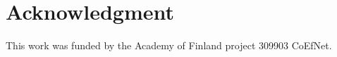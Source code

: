 \documentclass[conference,compsoc]{IEEEtran}
\begin{document}
\section*{Acknowledgment}
This work was funded by the Academy of Finland
project 309903 CoEfNet.






\end{document}
